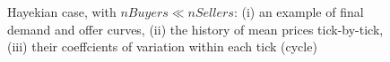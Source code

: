 \documentclass[12pt]{report}
\begin{document}
\begin{appendices}
\begin{figure}[htbp]
\begin{center}
\caption{Hayekian case, with $nBuyers \ll nSellers$: (i) an example of final demand and offer curves, (ii) the history of mean prices tick-by-tick, (iii) their coeffcients of variation within each tick (cycle)}
\label{output_3_1b.png}
\end{center}
\end{figure}


\end{appendices}
\end{document}
